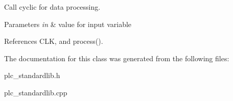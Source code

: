Call cyclic for data processing. 


\begin{DoxyParams}{Parameters}
{\em in} & value for input variable \\
\hline
\end{DoxyParams}


References C\+L\+K, and process().



The documentation for this class was generated from the following files\+:\begin{DoxyCompactItemize}
\item 
plc\+\_\+standardlib.\+h\item 
plc\+\_\+standardlib.\+cpp\end{DoxyCompactItemize}
